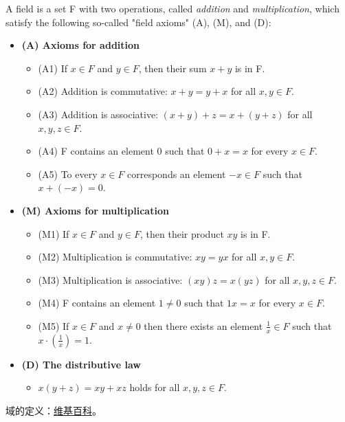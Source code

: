 \documentclass[../poma-note.tex]{subfiles}
\begin{document}
\setcounter{definition}{11}
\begin{definition}
	A field is a set F with two operations, called \textit{addition} and \textit{multiplication},
	which satisfy the following so-called "field axioms" (A), (M), and (D):

	\begin{itemize}
		\item[] \textbf{(A) Axioms for addition}
			\begin{itemize}
				\item[] (A1) If $x \in F$ and $y \in F$, then their sum $x + y$ is in F.
				\item[] (A2) Addition is commutative: $x + y = y + x$ for all $x,y \in F$.
				\item[] (A3) Addition is associative: $(x+y)+z=x+(y+z)$ for all $x,y,z \in F$.
				\item[] (A4) F contains an element 0 such that $0+x=x$ for every $x \in F$.
				\item[] (A5) To every $x \in F$ corresponds an element $-x \in F$ such that $x+(-x)=0$.
			\end{itemize}
		\item[] \textbf{(M) Axioms for multiplication}
			\begin{itemize}
				\item[] (M1) If $x \in F$ and $y \in F$, then their product $xy$ is in F.
				\item[] (M2) Multiplication is commutative: $xy = yx$ for all $x,y \in F$.
				\item[] (M3) Multiplication is associative: $(xy)z = x(yz)$ for all $x,y,z \in F$.
				\item[] (M4) F contains an element $1 \ne 0$ such that $1x = x$ for every $x \in F$.
				\item[] (M5) If $x \in F$ and $x \ne 0$ then there exists an element $\frac{1}{x} \in F$
					such that $x \cdot (\frac{1}{x}) = 1$.
			\end{itemize}
		\item[] \textbf{(D) The distributive law}
			\begin{itemize}
				\item[] $x(y+z) = xy+xz$ holds for all $x,y,z \in F$.
			\end{itemize}
	\end{itemize}
\end{definition}

\anote
域的定义：\href{https://en.wikipedia.org/wiki/Field_(mathematics)}{维基百科}。
\end{document}
